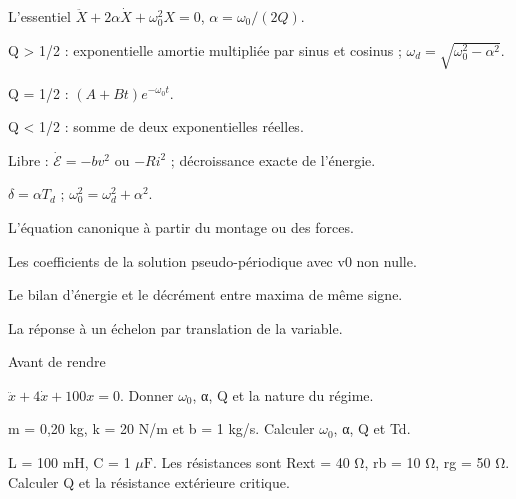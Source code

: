 \begin{loi}{L’essentiel}
$\ddot X+2\alpha\dot X+\omega_0^2X=0$, $\alpha=\omega_0/(2Q)$.\par Q > 1/2 : exponentielle amortie multipliée par sinus et cosinus ; $\omega_d=\sqrt{\omega_0^2-\alpha^2}$.\par Q = 1/2 : $(A+Bt)e^{-\omega_0t}$.\par Q < 1/2 : somme de deux exponentielles réelles.\par Libre : $\dot{\mathcal E}=-bv^2$ ou $-Ri^2$ ; décroissance exacte de l’énergie.\par $\delta=\alpha T_d$ ; $\omega_0^2=\omega_d^2+\alpha^2$.
\end{loi}
\begin{questions}
\item L’équation canonique à partir du montage ou des forces.
\item Les coefficients de la solution pseudo-périodique avec v0 non nulle.
\item Le bilan d’énergie et le décrément entre maxima de même signe.
\item La réponse à un échelon par translation de la variable.
\end{questions}

\begin{docu}{Avant de rendre}
\end{docu}


\begin{questions}
\item $\ddot x+4\dot x+100x=0$. Donner $\omega_0$, α, Q et la nature du régime.
\end{questions}

\begin{questions}
\item m = 0,20 kg, k = 20 N/m et b = 1 kg/s. Calculer $\omega_0$, α, Q et Td.
\end{questions}

\begin{questions}
\item L = 100 mH, C = 1 $\mu\mathrm{ F}$. Les résistances sont Rext = 40 Ω, rb = 10 Ω, rg = 50 Ω. Calculer Q et la résistance extérieure critique.
\end{questions}



